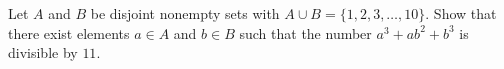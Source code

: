 Let $A$ and $B$ be disjoint nonempty sets with $A \cup  B = \{1, 2,3, \ldots, 10\}$. Show that there exist elements $a \in A$ and $b \in B$ such that the number $a^3 + ab^2 + b^3$ is divisible by $11$.
